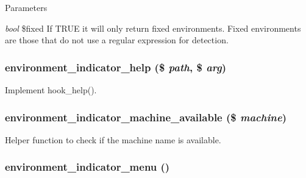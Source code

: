 \begin{DoxyParams}{Parameters}
\item[{\em bool}]\$fixed If TRUE it will only return fixed environments. Fixed environments are those that do not use a regular expression for detection. \end{DoxyParams}
\hypertarget{environment__indicator_8module_adfcb16b3db44378c6a441b5fa7b551a6}{
\subsubsection[{environment\_\-indicator\_\-help}]{\setlength{\rightskip}{0pt plus 5cm}environment\_\-indicator\_\-help (\$ {\em path}, \/  \$ {\em arg})}}
\label{environment__indicator_8module_adfcb16b3db44378c6a441b5fa7b551a6}
Implement hook\_\-help(). \hypertarget{environment__indicator_8module_ab2f10d13a885a023ba462bc38e2df00f}{
\subsubsection[{environment\_\-indicator\_\-machine\_\-available}]{\setlength{\rightskip}{0pt plus 5cm}environment\_\-indicator\_\-machine\_\-available (\$ {\em machine})}}
\label{environment__indicator_8module_ab2f10d13a885a023ba462bc38e2df00f}
Helper function to check if the machine name is available. \hypertarget{environment__indicator_8module_a2bd8a22de9eff55b8b81e063f715c60d}{
\subsubsection[{environment\_\-indicator\_\-menu}]{\setlength{\rightskip}{0pt plus 5cm}environment\_\-indicator\_\-menu ()}}
